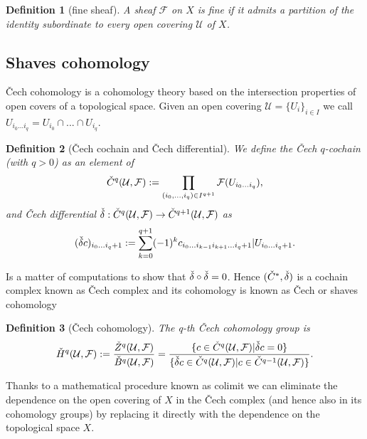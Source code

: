 \documentclass[a4paper,12pt]{article}
\newtheorem{Definition}{Definition}[section]
\begin{document}
\begin{Definition}[fine sheaf]
    A sheaf $\mathcal{F}$ on $X$ is fine if it admits a partition of the identity subordinate to every open covering $\mathcal{U}$ of $X$.
\end{Definition}



\subsection{Shaves cohomology}
Čech cohomology is a cohomology theory based on the intersection properties of open covers of a topological space. Given an open covering $\mathcal{U}=\{U_i\}_{i \in I}$ we call $U_{i_0...i_q}=U_{i_0} \cap ... \cap U_{i_q}$. 
\begin{Definition}[Čech cochain and Čech differential]
    We define the Čech $q$-cochain (with $q>0$) as an element of 
\begin{equation}
    \Check{C}^q(\mathcal{U},\mathcal{F}):=\prod_{(i_0,...,i_q) \in I^{q+1}}\mathcal{F}(U_{i_0...i_q}),
\end{equation}
and Čech differential $\Check{\delta} : \Check{C}^q(\mathcal{U},\mathcal{F}) \rightarrow \Check{C}^{q+1} (\mathcal{U},\mathcal{F})$ as
\begin{equation}
    (\Check{\delta} c)_{i_0...i_q+1}:=\sum_{k=0}^{q+1}(-1)^kc_{i_0...i_{k-1}i_{k+1}...i_q+1}|U_{i_0...i_q+1}.
\end{equation}
\end{Definition}
Is a matter of computations to show that $\Check{\delta} \circ \Check{\delta}=0$. Hence $(\Check{C}^*,\Check{\delta})$ is a cochain complex known as Čech complex and its cohomology is known as Čech or shaves cohomology
\begin{Definition}[Čech cohomology]
    The q-th Čech cohomology group is 
    \begin{equation}
\Check{H}^q(\mathcal{U},\mathcal{F}):=\frac{\Check{Z}^q(\mathcal{U},\mathcal{F})}{\Check{B}^q(\mathcal{U},\mathcal{F})}=\frac{\{c \in \Check{C}^q(\mathcal{U},\mathcal{F}) | \Check{\delta} c=0\}}{\{\Check{\delta} c \in \Check{C}^{q}(\mathcal{U},\mathcal{F}) | c \in \Check{C}^{q-1}(\mathcal{U},\mathcal{F})\}}.
    \end{equation}
\end{Definition}
Thanks to a mathematical procedure known as colimit \cite{lane1998categories} we can eliminate the dependence on the open covering of $X$ in the Čech complex (and hence also in its cohomology groups) by replacing it directly with the dependence on the topological space $X$.
\end{document}
